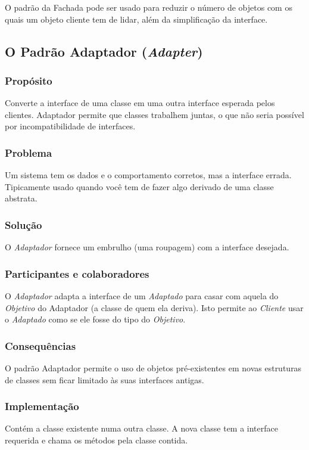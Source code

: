 O padrão da Fachada pode ser usado para reduzir o número de objetos com os quais um objeto cliente tem de lidar, além da simplificação da interface.

\subsection{O Padrão Adaptador (\textit{Adapter})}
\subsubsection{Propósito}
Converte a interface de uma classe em uma outra interface esperada pelos clientes. Adaptador permite que classes trabalhem juntas, o que não seria possível por incompatibilidade de interfaces.
 
\subsubsection{Problema}
Um sistema tem os dados e o comportamento corretos, mas a interface errada. Tipicamente usado quando você tem de fazer algo derivado de uma classe abstrata.

\subsubsection{Solução}
O \emph{Adaptador} fornece um embrulho (uma roupagem) com a interface desejada.

\subsubsection{Participantes e colaboradores}
O \emph{Adaptador} adapta a interface de um \emph{Adaptado} para casar com aquela do \emph{Objetivo} do Adaptador (a classe de quem ela deriva). Isto permite ao \emph{Cliente} usar o \emph{Adaptado} como se ele fosse do tipo do \emph{Objetivo}.

\subsubsection{Consequências}
O padrão Adaptador permite o uso de objetos pré-existentes em novas estruturas de classes sem ficar limitado às suas interfaces antigas.

\subsubsection{Implementação}
Contém a classe existente numa outra classe. A nova classe tem a interface requerida e chama os métodos pela classe contida.

